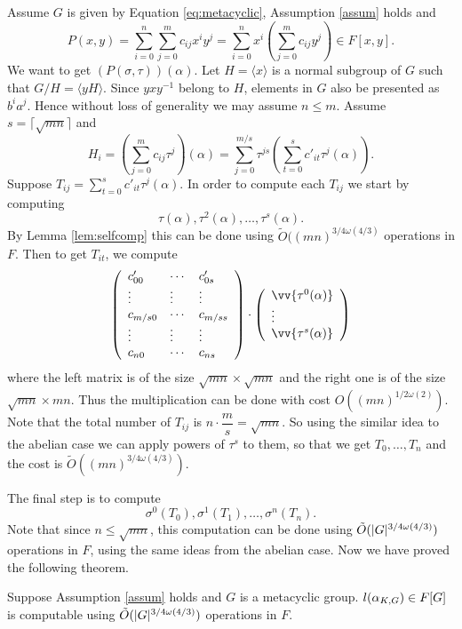  Assume $G$ is given by Equation \ref{eq:metacyclic}, Assumption \ref{assum} holds and 
 $$P(x,y) = \sum_{i= 0}^n \sum_{j=0}^m c_{ij}x^iy^j = \sum_{i= 0}^n x^i\left(\sum_{j=0}^m c_{ij}y^j \right) \in F[x,y]. $$
 We want to get $(P(\sigma,\tau))(\alpha)$. Let $H = \langle x \rangle$ is a normal subgroup of $G$ such that $G/H = \langle yH
  \rangle$. Since $yxy^{-1}$ belong to $H$, elements in $G$ also be presented as $b^i a^j$. Hence 
 without loss of generality we may assume $n \leq m$. Assume $s = \lceil \sqrt{mn} \rceil$ and
 $$H_i = (\sum_{j=0}^m c_{ij}\tau^j)(\alpha) = \sum_{j=0}^{m/ s} \tau^{js}\left(\sum_{t= 0}^{s}c'_{it}\tau^j(\alpha)\right).$$
 Suppose $T_{ij} = \sum_{t= 0}^{s}c'_{it}\tau^j(\alpha)$. In order to compute each $T_{ij}$ we start by computing 
 $$\tau(\alpha), \tau^2(\alpha), \ldots , \tau^{s}(\alpha).$$
 By Lemma \ref{lem:selfcomp} this can be done using $\tilde{O}((mn)^{3/4 \omega(4/3)}$ operations in $F$. Then to get $T_{it}$, we compute
 $$
\left(\begin{array}{lll}
c'_{00} & \cdots & c'_{0s}\\
\vdots & \vdots & \vdots\\
c_{m/s0} & \cdots & c_{m/ss}\\
\vdots & \vdots & \vdots\\
c_{n0} & \cdots & c_{ns}
\end{array} \right)
\cdot
\left( \begin{array}{l}
\vv{\tau^0(\alpha)}\\
\vdots\\
\vv{\tau^s(\alpha)}
\end{array}
\right)
 $$
 where the left matrix is of the size $\sqrt{mn} \times \sqrt{mn}$ and the right one is of the size $\sqrt{mn} \times mn$. Thus the 
 multiplication can be done with cost $O((mn)^{1/2 \omega(2)})$. Note that the total number of $T_{ij}$ is $n\cdot\dfrac{m}{s} = 
 \sqrt{mn}$. So using the similar idea to the abelian case we can apply powers of $\tau^s$ to them, so that we get 
 $T_0, \ldots, T_n$ and the cost is $\tilde{O}((mn)^{3/4\omega(4/3)})$.
 
 The final step is to compute $$\sigma^0(T_0), \sigma^1(T_1) , \ldots , \sigma^n (T_n).$$
Note that since $n \leq \sqrt{mn}$, this computation can be done using $\tilde{O}(\vert G \vert ^{3/4 \omega(4/3)})$ operations in $F$, using the same ideas from the abelian case. Now we have proved the following theorem.

\begin{proposition}
Suppose Assumption \ref{assum} holds and $G$ is a metacyclic group. $l(\alpha_{K,G}) \in F[G]$ is computable using $\tilde{O}(\vert G \vert ^{3/4 \omega(4/3)})$ 
operations in $F$.
\end{proposition}

